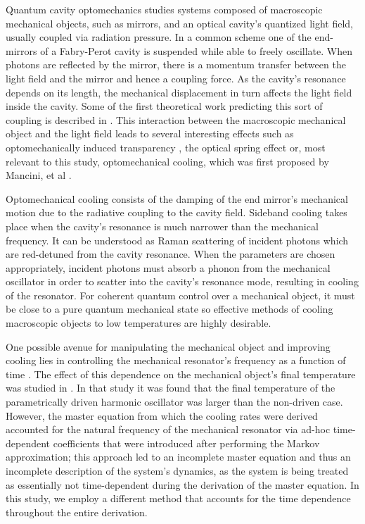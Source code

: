 \documentclass[reprint, amsmath,amssymb, aps,pra]{revtex4-1}
\begin{document}
Quantum cavity optomechanics studies systems composed of macroscopic
mechanical objects, such as mirrors, and an optical cavity's quantized
light field, usually coupled via radiation pressure. In a common scheme
one of the end-mirrors of a Fabry-Perot cavity is suspended while able
to freely oscillate. When photons are reflected by the mirror, there
is a momentum transfer between the light field and the mirror and
hence a coupling force. As the cavity's resonance depends on its
length, the mechanical displacement in turn affects the light field
inside the cavity. Some of the first theoretical work predicting this
sort of coupling is described in \cite{BraginskiiOG}. This interaction
between the macroscopic mechanical object and the light field leads to
several interesting effects such as optomechanically induced
transparency \cite{WeissOIT}, the optical spring effect \cite{VogelOT}
or, most relevant to this study, optomechanical cooling, which was
first proposed by Mancini, et al \cite{CohadonCM, CorbittOC,
  SchliesserRPC, LCNooshi, ManciniOC}.
	
Optomechanical cooling consists of the damping of the end mirror's
mechanical motion due to the radiative coupling to the cavity field.
Sideband cooling takes place when the cavity's resonance is much
narrower than the mechanical frequency. It can be understood as Raman
scattering of incident photons \cite{MarquardtQTOQ} which are
red-detuned from the cavity resonance. When the parameters are chosen
appropriately, incident photons must absorb a phonon from the
mechanical oscillator in order to scatter into the cavity's resonance
mode, resulting in cooling of the resonator. For coherent quantum
control over a mechanical object, it must be close to a pure quantum
mechanical state \cite{KippenberCO} so effective methods of cooling
macroscopic objects to low temperatures are highly desirable.

One possible avenue for manipulating the mechanical object and
improving cooling lies in controlling the mechanical resonator's
frequency as a function of time \cite{JockelMR}. The effect of this
dependence on the mechanical object's final temperature was studied in
\cite{BarberisLC}. In that study it was found that the final
temperature of the parametrically driven harmonic oscillator was
larger than the non-driven case. However, the master equation from
which the cooling rates were derived accounted for the natural
frequency of the mechanical resonator via ad-hoc time-dependent
coefficients that were introduced after performing the Markov
approximation; this approach led to an incomplete master equation and
thus an incomplete description of the system's dynamics, as the system
is being treated as essentially not time-dependent during the
derivation of the master equation. In this study, we employ a
different method that accounts for the time dependence throughout the
entire derivation.
\end{document}
